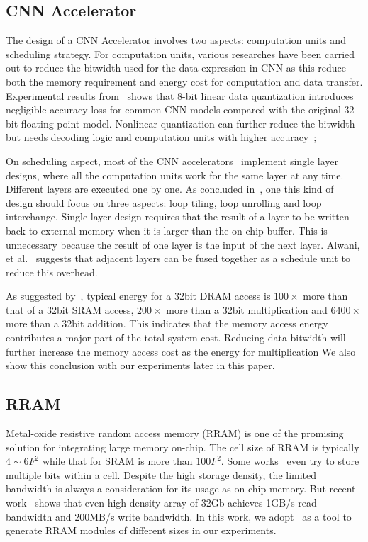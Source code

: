 \subsection{CNN Accelerator}
The design of a CNN Accelerator involves two aspects: computation units and scheduling strategy. For computation units, various researches have been carried out to reduce the bitwidth used for the data expression in CNN as this reduce both the memory requirement and energy cost for computation and data transfer. Experimental results from~\cite{guo2017software} shows that 8-bit linear data quantization introduces negligible accuracy loss for common CNN models compared with the original 32-bit floating-point model. Nonlinear quantization can further reduce the bitwidth~\cite{han2015deep} but needs decoding logic and computation units with higher accuracy~\cite{eie};

On scheduling aspect, most of the CNN accelerators~\cite{zhang2015optimizing}\cite{qiu2016going}\cite{ma2017optimizing} implement single layer designs, where all the computation units work for the same layer at any time. Different layers are executed one by one. As concluded in~\cite{ma2017optimizing}, one this kind of design should focus on three aspects: loop tiling, loop unrolling and loop interchange. Single layer design requires that the result of a layer to be written back to external memory when it is larger than the on-chip buffer. This is unnecessary because the result of one layer is the input of the next layer. Alwani, et al.~\cite{alwani2016fused} suggests that adjacent layers can be fused together as a schedule unit to reduce this overhead.

As suggested by~\cite{mac_energy}, typical energy for a 32bit DRAM access is $100\times$ more than that of a 32bit SRAM access, $200\times$ more than a 32bit multiplication and $6400\times$ more than a 32bit addition. This indicates that the memory access energy contributes a major part of the total system cost. Reducing data bitwidth will further increase the memory access cost as the energy for multiplication We also show this conclusion with our experiments later in this paper.

\subsection{RRAM}
Metal-oxide resistive random access memory (RRAM) is one of the promising solution for integrating large memory on-chip. The cell size of RRAM is typically $4\sim 6F^2$ while that for SRAM is more than $100F^2$. Some works~\cite{chien2009multi}\cite{chien2011multi} even try to store multiple bits within a cell. Despite the high storage density, the limited bandwidth is always a consideration for its usage as on-chip memory. But recent work~\cite{fackenthal201419} shows that even high density array of 32Gb achieves 1GB/s read bandwidth and 200MB/s write bandwidth. In this work, we adopt~\cite{dong2014nvsim} as a tool to generate RRAM modules of different sizes in our experiments.